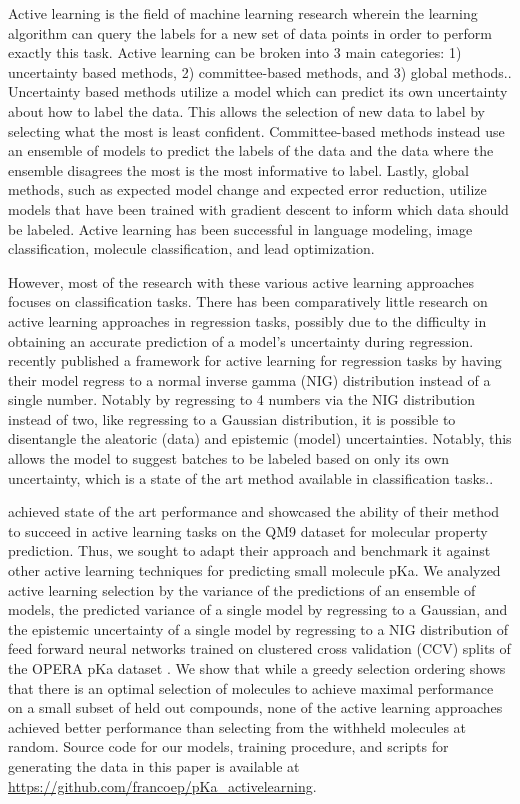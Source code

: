 \documentclass[journal=jmcmar,manuscript=article]{achemso}
\begin{document}
Active learning is the field of machine learning research wherein the learning algorithm can query the labels for a new set of data points in order to perform exactly this task. Active learning can be broken into 3 main categories: 1) uncertainty based methods, 2) committee-based methods, and 3) global methods.\cite{alreview1,alreview2}. Uncertainty based methods utilize a model which can predict its own uncertainty about how to label the data. This allows the selection of new data to label by selecting what the most is least confident. Committee-based methods instead use an ensemble of models to predict the labels of the data and the data where the ensemble disagrees the most is the most informative to label. Lastly, global methods, such as expected model change and expected error reduction, utilize models that have been trained with gradient descent to inform which data should be labeled. Active learning has been successful in language modeling\cite{allanguage}, image classification\cite{allanguage}, molecule classification\cite{alcompoundclass}, and lead optimization\cite{alleadop}. 

However, most of the research with these various active learning approaches focuses on classification tasks. There has been comparatively little research on active learning approaches in regression tasks\cite{alreggreedysample,alnigregress}, possibly due to the difficulty in obtaining an accurate prediction of a model's uncertainty during regression. \citet{alnigregress} recently published a framework for active learning for regression tasks by having their model regress to a normal inverse gamma (NIG) distribution instead of a single number. Notably by regressing to 4 numbers via the NIG distribution instead of two, like regressing to a Gaussian distribution, it is possible to disentangle the aleatoric (data) and epistemic (model) uncertainties. \cite{alnigregress} Notably, this allows the model to suggest batches to be labeled based on only its own uncertainty, which is a state of the art method available in classification tasks.\cite{directepistemicunc}. 

\citet{alnigregress} achieved state of the art performance and showcased the ability of their method to succeed in active learning tasks on the QM9 dataset for molecular property prediction. Thus, we sought to adapt their approach and benchmark it against other active learning techniques for predicting small molecule pKa. We analyzed active learning selection by the variance of the predictions of an ensemble of models, the predicted variance of a single model by regressing to a Gaussian, and the epistemic uncertainty of a single model by regressing to a NIG distribution of feed forward neural networks trained on clustered cross validation (CCV) splits of the OPERA pKa dataset \cite{operapKa}. We show that while a greedy selection ordering shows that there is an optimal selection of molecules to achieve maximal performance on a small subset of held out compounds, none of the active learning approaches achieved better performance than selecting from the withheld molecules at random. Source code for our models, training procedure, and scripts for generating the data in this paper is available at \url{https://github.com/francoep/pKa_activelearning}.
\end{document}
